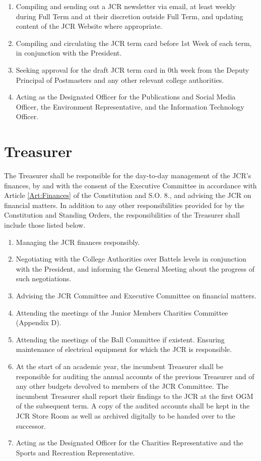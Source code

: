 \begin{enumerate}
    \item Compiling and sending out a JCR newsletter via email, at least weekly during Full Term and at their discretion outside Full Term, and updating content of the JCR Website where appropriate. 
    \item Compiling and circulating the JCR term card before 1st Week of each term, in conjunction with the President. 
    \item Seeking approval for the draft JCR term card in 0th week from the Deputy Principal of Postmasters and any other relevant college authorities. 
    \item Acting as the Designated Officer for the Publications and Social Media Officer, the Environment Representative, and the Information Technology Officer.
\end{enumerate}

\section{Treasurer}
\npara The Treasurer shall be responsible for the day-to-day management of the JCR's finances, by and with the consent of the Executive Committee in accordance with Article \ref{Art:Finances} of the Constitution and S.O. 8., and advising the JCR on financial matters.
\npara In addition to any other responsibilities provided for by the Constitution and Standing Orders, the responsibilities of the Treasurer shall include those listed below.
\begin{enumerate}
	\item Managing the JCR finances responsibly.     
	\item Negotiating with the College Authorities over Battels levels in conjunction with the President, and informing the General Meeting about the progress of such negotiations.
	\item Advising the JCR Committee and Executive Committee on financial matters.
	\item Attending the meetings of the Junior Members Charities Committee (Appendix D).          
	\item Attending the meetings of the Ball Committee if existent.     
	Ensuring maintenance of electrical equipment for which the JCR is responsible.     
	\item At the start of an academic year, the incumbent Treasurer shall be responsible for auditing the annual accounts of the previous Treasurer and of any other budgets devolved to members of the JCR Committee.
	The incumbent Treasurer shall report their findings to the JCR at the first OGM of the subsequent term.
	A copy of the audited accounts shall be kept in the JCR Store Room as well as archived digitally to be handed over to the successor.
	\item Acting as the Designated Officer for the Charities Representative and the Sports and Recreation Representative.
\end{enumerate}
